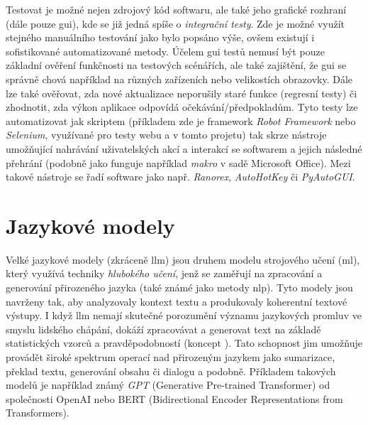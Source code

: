 \documentclass[czech, ma, kiv, he, iso690numb, pdf, viewonly]{fasthesis}
\begin{document}
    Testovat je možné nejen zdrojový kód softwaru, ale také jeho grafické rozhraní (dále pouze \Acrshort{gui}), kde se již jedná spíše o \textit{integrační testy}. Zde je možné využít stejného manuálního testování jako bylo popsáno výše, ovšem existují i sofistikované automatizované metody. Účelem \Acrshort{gui} testů nemusí být pouze základní ověření funkčnosti na testových scénářích, ale také zajištění, že \Acrshort{gui} se správně chová například na různých zařízeních nebo velikostích obrazovky. Dále lze také ověřovat, zda nové aktualizace neporušily staré funkce (regresní testy) či zhodnotit, zda výkon aplikace odpovídá očekávání/předpokladům. Tyto testy lze automatizovat jak skriptem (příkladem zde je framework \textit{Robot Framework} nebo \textit{Selenium}, využívané pro testy webu a v tomto projetu) tak skrze nástroje umožňující nahrávání uživatelských akcí a interakcí se softwarem a jejich následné přehrání (podobně jako funguje například \textit{makro} v sadě Microsoft Office). Mezi takové nástroje se řadí software jako např. \textit{Ranorex}, \textit{AutoHotKey} či \textit{PyAutoGUI}. \cite{alegroth2016maintenance}

    \section{Jazykové modely} \label{sec:language_models}

    Velké jazykové modely (zkráceně \Gls{llm}) jsou druhem modelu strojového učení (\Acrshort{ml}), který využívá techniky \textit{hlubokého učení}, jenž se zaměřují na zpracování a generování přirozeného jazyka (také známé jako metody \Acrshort{nlp}). Tyto modely jsou navrženy tak, aby analyzovaly kontext textu a produkovaly koherentní textové výstupy. I když \Gls{llm} nemají skutečné porozumění významu jazykových promluv ve smyslu lidského chápání, dokáží zpracovávat a generovat text na základě statistických vzorců a pravděpodobností (koncept  \cite{wiki:ChineseRoom}). Tato schopnost jim umožňuje provádět široké spektrum operací nad přirozeným jazykem jako sumarizace, překlad textu, generování obsahu či dialogu a podobně. Příkladem takových modelů je například známý \textit{GPT} (Generative Pre-trained Transformer) od společnosti OpenAI nebo BERT (Bidirectional Encoder Representations from Transformers).
    \cite{devlin2019bert} \cite{googleML2023} \cite{cloudflareLLM2023}
\end{document}
